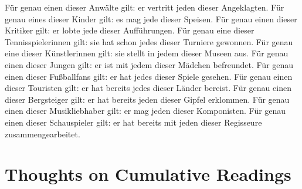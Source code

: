 \documentclass[fleqn,reqno,10pt,draft]{article}
\begin{document}
\begin{exe}
  \ex
    \begin{xlist}
    \ex Für genau einen dieser Anwälte gilt: er vertritt jeden
      dieser Angeklagten.
    \ex Für genau eines dieser Kinder gilt: es mag jede dieser
      Speisen.
    \ex Für genau einen dieser Kritiker gilt: er lobte jede dieser
      Aufführungen.
    \ex Für genau eine dieser Tennisspielerinnen gilt: sie hat schon
      jedes dieser Turniere gewonnen.
    \ex Für genau eine dieser Künstlerinnen gilt: sie stellt in jedem
      dieser Museen aus.
    \ex Für genau einen dieser Jungen gilt: er ist mit jedem dieser
      Mädchen befreundet.
    \ex Für genau einen dieser Fußballfans gilt: er hat jedes dieser
      Spiele gesehen.
    \ex Für genau einen dieser Touristen gilt: er hat bereits jedes dieser
      Länder bereist.
    \ex Für genau einen dieser Bergsteiger gilt: er hat bereits jeden dieser
      Gipfel erklommen.
    \ex Für genau einen dieser Musikliebhaber gilt: er mag jeden
      dieser Komponisten.
    \ex Für genau einen dieser Schauspieler gilt: er hat bereits mit jeden dieser
      Regisseure zusammengearbeitet.
    \end{xlist}
\end{exe}

\newpage

\section{Thoughts on Cumulative Readings}
\label{sec:thoughts-cumul-read}
\end{document}

